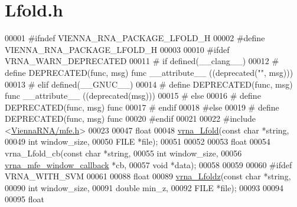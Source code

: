 \hypertarget{Lfold_8h_source}{}\section{Lfold.\+h}
\label{Lfold_8h_source}

\begin{DoxyCode}
00001 \textcolor{preprocessor}{#ifndef VIENNA\_RNA\_PACKAGE\_LFOLD\_H}
00002 \textcolor{preprocessor}{#define VIENNA\_RNA\_PACKAGE\_LFOLD\_H}
00003 
00010 \textcolor{preprocessor}{#ifdef VRNA\_WARN\_DEPRECATED}
00011 \textcolor{preprocessor}{# if defined(\_\_clang\_\_)}
00012 \textcolor{preprocessor}{#  define DEPRECATED(func, msg) func \_\_attribute\_\_ ((deprecated("", msg)))}
00013 \textcolor{preprocessor}{# elif defined(\_\_GNUC\_\_)}
00014 \textcolor{preprocessor}{#  define DEPRECATED(func, msg) func \_\_attribute\_\_ ((deprecated(msg)))}
00015 \textcolor{preprocessor}{# else}
00016 \textcolor{preprocessor}{#  define DEPRECATED(func, msg) func}
00017 \textcolor{preprocessor}{# endif}
00018 \textcolor{preprocessor}{#else}
00019 \textcolor{preprocessor}{# define DEPRECATED(func, msg) func}
00020 \textcolor{preprocessor}{#endif}
00021 
00022 \textcolor{preprocessor}{#include <\hyperlink{mfe_8h}{ViennaRNA/mfe.h}>}
00023 
00047 \textcolor{keywordtype}{float}
00048 \hyperlink{group__local__mfe__fold_ga4918cce52bf69c1913cda503b2ac75d8}{vrna\_Lfold}(\textcolor{keyword}{const} \textcolor{keywordtype}{char} *\textcolor{keywordtype}{string},
00049            \textcolor{keywordtype}{int}        window\_size,
00050            FILE       *file);
00051 
00052 
00053 \textcolor{keywordtype}{float}
00054 vrna\_Lfold\_cb(\textcolor{keyword}{const} \textcolor{keywordtype}{char}                *\textcolor{keywordtype}{string},
00055               \textcolor{keywordtype}{int}                       window\_size,
00056               \hyperlink{group__mfe__fold_ga4f3e5bc214ef803074ace313cb9571b4}{vrna\_mfe\_window\_callback}  *cb,
00057               \textcolor{keywordtype}{void}                      *data);
00058 
00059 
00060 \textcolor{preprocessor}{#ifdef VRNA\_WITH\_SVM}
00061 
00088 \textcolor{keywordtype}{float}
00089 \hyperlink{group__local__mfe__fold_ga27fddda5fc63eb49c861e38845fc34b4}{vrna\_Lfoldz}(\textcolor{keyword}{const} \textcolor{keywordtype}{char}  *\textcolor{keywordtype}{string},
00090             \textcolor{keywordtype}{int}         window\_size,
00091             \textcolor{keywordtype}{double}      min\_z,
00092             FILE        *file);
00093 
00094 
00095 \textcolor{keywordtype}{float}

\end{DoxyCode}

